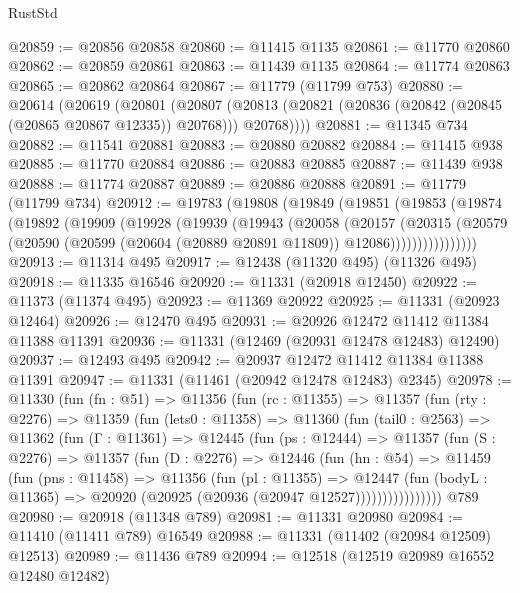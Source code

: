 \begin{lexlean}{RustStd}
\begin{coremodule}
@20859 := @20856 @20858
@20860 := @11415 @1135
@20861 := @11770 @20860
@20862 := @20859 @20861
@20863 := @11439 @1135
@20864 := @11774 @20863
@20865 := @20862 @20864
@20867 := @11779 (@11799 @753)
@20880 := @20614
    (@20619
      (@20801
        (@20807 (@20813 (@20821 (@20836 (@20842 (@20845 (@20865 @20867 @12335)) @20768))) @20768))))
@20881 := @11345 @734
@20882 := @11541 @20881
@20883 := @20880 @20882
@20884 := @11415 @938
@20885 := @11770 @20884
@20886 := @20883 @20885
@20887 := @11439 @938
@20888 := @11774 @20887
@20889 := @20886 @20888
@20891 := @11779 (@11799 @734)
@20912 := @19783
    (@19808
      (@19849
        (@19851
          (@19853
            (@19874
              (@19892
                (@19909
                  (@19928
                    (@19939
                      (@19943
                        (@20058
                          (@20157
                            (@20315
                              (@20579
                                (@20590
                                  (@20599 (@20604 (@20889 @20891 @11809)) @12086))))))))))))))))
@20913 := @11314 @495
@20917 := @12438 (@11320 @495) (@11326 @495)
@20918 := @11335 @16546
@20920 := @11331 (@20918 @12450)
@20922 := @11373 (@11374 @495)
@20923 := @11369 @20922
@20925 := @11331 (@20923 @12464)
@20926 := @12470 @495
@20931 := @20926 @12472 @11412 @11384 @11388 @11391
@20936 := @11331 (@12469 (@20931 @12478 @12483) @12490)
@20937 := @12493 @495
@20942 := @20937 @12472 @11412 @11384 @11388 @11391
@20947 := @11331 (@11461 (@20942 @12478 @12483) @2345)
@20978 := @11330
    (fun (fn : @51) =>
    @11356
      (fun (rc : @11355) =>
      @11357
        (fun (rty : @2276) =>
        @11359
          (fun (lets0 : @11358) =>
          @11360
            (fun (tail0 : @2563) =>
            @11362
              (fun (Γ : @11361) =>
              @12445
                (fun (ps : @12444) =>
                @11357
                  (fun (S : @2276) =>
                  @11357
                    (fun (D : @2276) =>
                    @12446
                      (fun (hn : @54) =>
                      @11459
                        (fun (pns : @11458) =>
                        @11356
                          (fun (pl : @11355) =>
                          @12447
                            (fun (bodyL : @11365) =>
                            @20920 (@20925 (@20936 (@20947 @12527))))))))))))))))
    @789
@20980 := @20918 (@11348 @789)
@20981 := @11331 @20980
@20984 := @11410 (@11411 @789) @16549
@20988 := @11331 (@11402 (@20984 @12509) @12513)
@20989 := @11436 @789
@20994 := @12518 (@12519 @20989 @16552 @12480 @12482)

\end{coremodule}
\end{lexlean}
